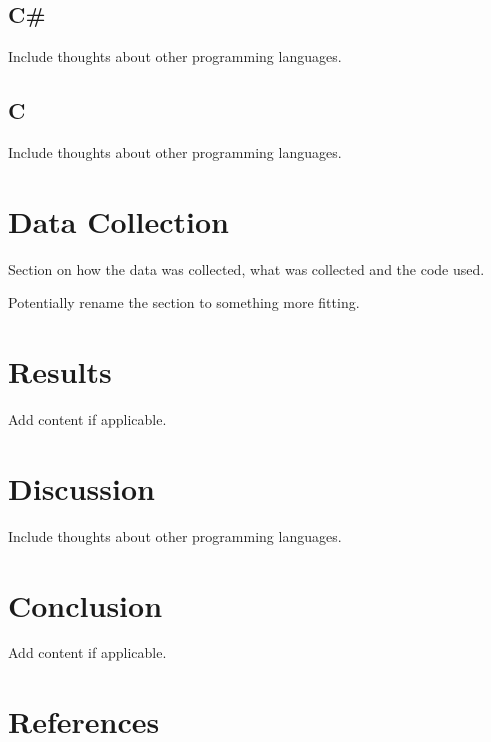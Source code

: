 \documentclass{article}
\begin{document}
\subsection{C\#}

Include thoughts about other programming languages.

\subsection{C}

Include thoughts about other programming languages.

\section{Data Collection}

Section on how the data was collected, what was collected and the code used. 

Potentially rename the section to something more fitting.

\section{Results}

Add content if applicable.

\section{Discussion}

Include thoughts about other programming languages.

\section{Conclusion}

Add content if applicable.

\newpage
\section{References}
\printbibliography
\end{document}
